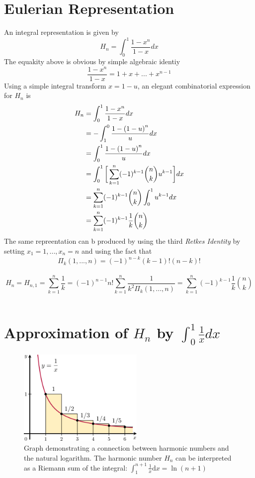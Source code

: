 \documentclass[2pt]{article}
\begin{document}
\section{Eulerian Representation}
An integral representation is given by
\begin{equation}
H_{n} = \int_{0}^{1} \frac{1-x^n}{1-x} dx \label{Euler equation}\nonumber
\end{equation}
The equakity above is obvious by simple algebraic identiy
\begin{equation}
\frac{1-x^n}{1-x} = 1+x+...+x^{n-1}\nonumber
\end{equation}
Using a simple integral transform ${x = 1-u}$, an elegant combinatorial expression for $H_{n}$ is
\begin{align}
H_{n} &= \int_{0}^{1} \frac{1-x^n}{1-x} dx\nonumber \\
	 &= -\int_{1}^{0} \frac{1-{(1-u)}^n}{u} dx \nonumber \\
	 &= \int_{0}^{1} \frac{1-{(1-u)}^n}{u} dx \nonumber \\
	 &= \int_{0}^{1} \bigg{[}\sum_{k=1}^{n} (-1)^{k-1} {n \choose k} u^{k-1}\bigg{]}dx \nonumber \\
	 &= \sum_{k=1}^{n} (-1)^{k-1} {n \choose k} \int_{0}^{1} u^{k-1} \nonumber dx\\
	 &= \sum_{k=1}^{n} (-1)^{k-1} \frac{1}{k} {n \choose k} \nonumber
\end{align}
The same repreentation can b produced by using the third \emph{Retkes Identity} by setting $x_{1} = 1, . . . , x_{n} = n$ and using the fact that
\begin{equation}
{\Pi}_{k}(1, . . . , n) = {(-1)}^{n-k} (k-1)!(n-k)! \nonumber
\end{equation}
\\
\begin{equation}
H_{n}=H_{n,1}=\sum_{k=1}^{n} \frac{1}{k} = {(-1)}^{n-1}n!\sum_{k=1}^{n}\frac{1}{k^{2}{\Pi}_{k}(1, . . . ,n)}=\sum_{k=1}^{n}{(-1)}^{k-1}\frac{1}{k}{n \choose k} \nonumber
\end{equation}
\\
\section{Approximation of $H_{n}$ by $\int_{0}^{1}\frac{1}{x} dx$}
\begin{figure}
\includegraphics[width=6cm]{2.png}
\caption{\small{Graph demonstrating a connection between harmonic numbers and the natural logarithm. The harmonic number $H_{n}$ can be interpreted as a Riemann sum of the integral: $\int_1^{n+1} \frac{1}{x} \mathrm{d}x = \ln(n+1)$}}
\end{figure}
\end{document}
